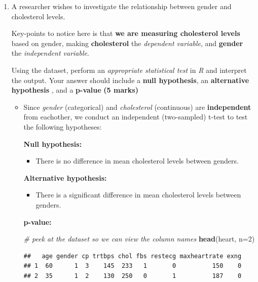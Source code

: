 \documentclass[
]{article}
\newenvironment{Shaded}{\begin{snugshade}}{\end{snugshade}}
\newcommand{\AttributeTok}[1]{\textcolor[rgb]{0.13,0.29,0.53}{#1}}
\newcommand{\CommentTok}[1]{\textcolor[rgb]{0.56,0.35,0.01}{\textit{#1}}}
\newcommand{\DecValTok}[1]{\textcolor[rgb]{0.00,0.00,0.81}{#1}}
\newcommand{\FunctionTok}[1]{\textcolor[rgb]{0.13,0.29,0.53}{\textbf{#1}}}
\newcommand{\NormalTok}[1]{#1}
\providecommand{\tightlist}{%
  \setlength{\itemsep}{0pt}\setlength{\parskip}{0pt}}
\begin{document}
\begin{enumerate}
\def\labelenumi{\arabic{enumi}.}
\setcounter{enumi}{1}
\item
  A researcher wishes to investigate the relationship between gender and
  cholesterol levels.

  Key-points to notice here is that \textbf{we are measuring cholesterol
  levels} based on gender, making \textbf{cholesterol} the
  \emph{dependent variable}, and \textbf{gender} the \emph{independent
  variable}.

  Using the dataset, perform an \emph{appropriate statistical test} in
  \emph{R} and interpret the output. Your answer should include a
  \textbf{null hypothesis}, an \textbf{alternative hypothesis }, and a
  \textbf{p-value } \textbf{(5 marks)}

  \begin{itemize}
  \item
    Since \emph{gender} (categorical) and \emph{cholesterol}
    (continuous) are \textbf{independent} from eachother, we conduct an
    independent (two-sampled) t-test to test the following hypotheses:

    \textbf{Null hypothesis:}

    \begin{itemize}
    \tightlist
    \item
      There is no difference in mean cholesterol levels between genders.
    \end{itemize}

    \textbf{Alternative hypothesis:}

    \begin{itemize}
    \tightlist
    \item
      There is a significant difference in mean cholesterol levels
      between genders.
    \end{itemize}

    \textbf{p-value:}

\begin{Shaded}
\begin{Highlighting}[]
\CommentTok{\# peek at the dataset so we can view the column names}
\FunctionTok{head}\NormalTok{(heart, }\AttributeTok{n=}\DecValTok{2}\NormalTok{)}
\end{Highlighting}
\end{Shaded}

\begin{verbatim}
##   age gender cp trtbps chol fbs restecg maxheartrate exng
## 1  60      1  3    145  233   1       0          150    0
## 2  35      1  2    130  250   0       1          187    0
\end{verbatim}


\end{itemize}
\end{enumerate}
\end{document}
